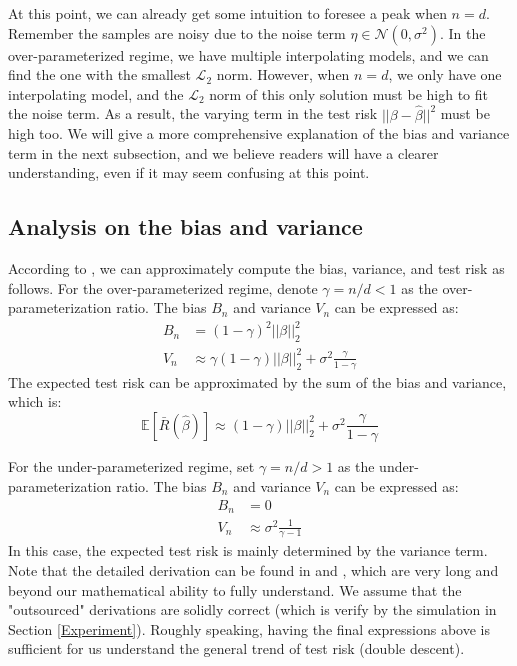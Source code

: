 \documentclass{article}
\begin{document}
At this point, we can already get some intuition to foresee a peak when $n = d$. Remember the samples are noisy due to the noise term $\eta \in \mathcal{N}(0, \sigma^2)$. In the over-parameterized regime, we have multiple interpolating models, and we can find the one with the smallest $\mathcal{L}_2$ norm. However, when $n = d$, we only have one interpolating model, and the $\mathcal{L}_2$ norm of this only solution must be high to fit the noise term. As a result, the varying term in the test risk $||\beta - \hat{\beta}||^2$ must be high too. We will give a more comprehensive explanation of the bias and variance term in the next subsection, and we believe readers will have a clearer understanding, even if it may seem confusing at this point. 

\subsection{Analysis on the bias and variance}\label{analysis}
According to \cite{nakkiran2021deep}, we can approximately compute the bias, variance, and test risk as follows. For the over-parameterized regime, denote $\gamma = n/d < 1$ as the over-parameterization ratio. The bias $B_n$ and variance $V_n$ can be expressed as:
\begin{align} 
	B_n &= (1 - \gamma)^2||\beta||_2^2\\ 
	V_n &\approx \gamma (1-\gamma)||\beta||_2^2 + \sigma^2\frac{\gamma}{1-\gamma}
\end{align}
The expected test risk can be approximated by the sum of the bias and variance, which is:
\begin{equation}
	\mathbb{E}[\bar{R}(\hat{\beta})] \approx (1-\gamma)||\beta||_2^2 + \sigma^2\frac{\gamma}{1-\gamma}
\end{equation}

For the under-parameterized regime, set $\gamma = n/d > 1$ as the under-parameterization ratio. The bias $B_n$ and variance $V_n$ can be expressed as:
\begin{align} 
	B_n &= 0\\ 
	V_n &\approx \sigma^2\frac{1}{\gamma - 1}
\end{align}
In this case, the expected test risk is mainly determined by the variance term. Note that the detailed derivation can be found in \cite{nakkiran2021deep} and \cite{hastie2022surprises}, which are very long and beyond our mathematical ability to fully understand. We assume that the "outsourced" derivations are solidly correct (which is verify by the simulation in Section \ref{Experiment}). Roughly speaking, having the final expressions above is sufficient for us understand the general trend of test risk (double descent).
\end{document}
